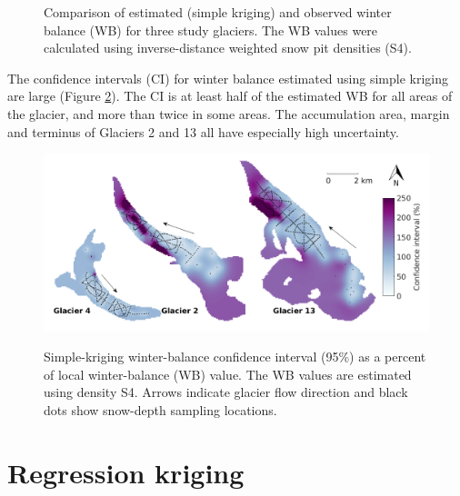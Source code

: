 \documentclass{sfuthesis}
\newcommand{\topomap}{Arrows indicate glacier flow direction and black dots show snow-depth sampling locations. }
\begin{document}
{\begin{figure}[H]
	\caption[Comparison of estimated (simple kriging) and observed winter balance (WB) for three study glaciers]{Comparison of estimated (simple kriging) and observed winter balance (WB) for three study glaciers. The WB values were calculated using inverse-distance weighted snow pit densities (S4).}
	\label{fig:R2simplekrig}
\end{figure}

The confidence intervals (CI) for winter balance estimated using simple kriging are large (Figure \ref{fig:krigingCI_percent}). The CI is at least half of the estimated WB for all areas of the glacier, and more than twice in some areas. The accumulation area, margin and terminus of Glaciers 2 and 13 all have especially high uncertainty. 

\begin{figure}[H]
	\centering
	\includegraphics[width = \textwidth]{KrigingCI_percent.png}\\
	\caption[Simple-kriging winter-balance confidence interval (95\%) as a percent of local winter-balance value]{Simple-kriging winter-balance confidence interval (95\%) as a percent of local winter-balance (WB) value. The WB values are estimated using density S4. \topomap}
	\label{fig:krigingCI_percent}
\end{figure}

\section{Regression kriging}
\label{sec:regressionkriging}

}
\end{document}
